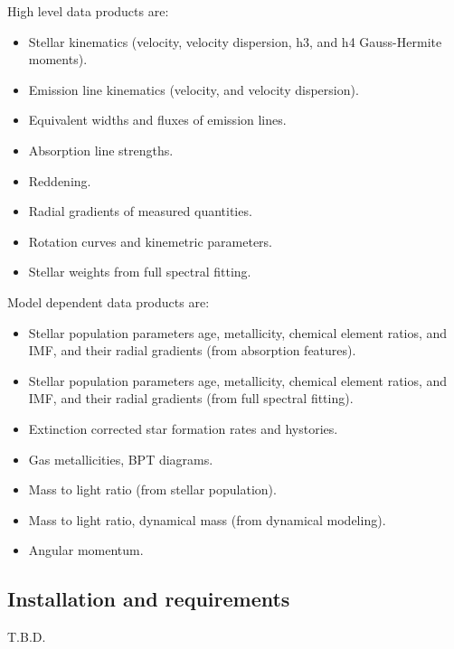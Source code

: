 \documentclass[11pt]{book}
\begin{document}
High level data products are:
\begin{itemize}
     \item Stellar kinematics (velocity, velocity dispersion, h3, and h4 Gauss-Hermite moments).
     \item Emission line kinematics (velocity, and velocity dispersion).
     \item Equivalent widths and fluxes of emission lines.
     \item Absorption line strengths.
     \item Reddening.
     \item Radial gradients of measured quantities.
     \item Rotation curves and kinemetric parameters.
     \item Stellar weights from full spectral fitting.
\end{itemize}

Model dependent data products are:
\begin{itemize}
    \item Stellar population parameters age, metallicity, chemical
      element ratios, and IMF, and their radial gradients (from absorption features).
    \item Stellar population parameters age, metallicity, chemical
      element ratios, and IMF, and their radial gradients (from full spectral fitting).
    \item Extinction corrected star formation rates and hystories.
    \item Gas metallicities, BPT diagrams.
    \item Mass to light ratio (from stellar population).
    \item Mass to light ratio, dynamical mass (from dynamical
      modeling).
    \item Angular momentum.
\end{itemize}%

\subsection{Installation and requirements}
\label{dap_sec:installation}
T.B.D.


\end{document}
